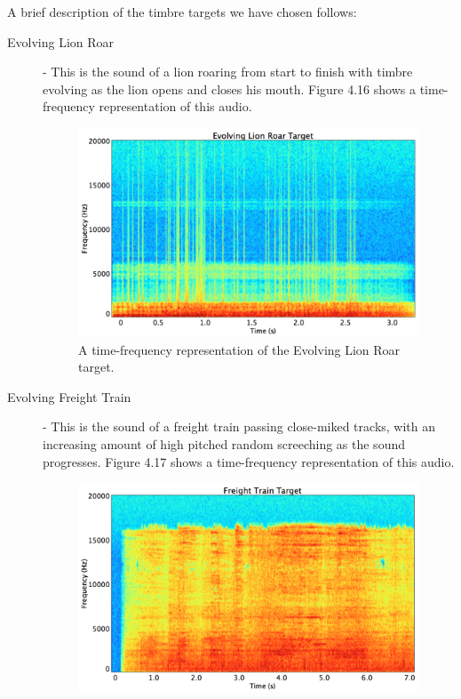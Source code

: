 \documentclass[12pt]{report} 	%
\numberwithin{figure}{chapter}
\numberwithin{table}{chapter}
\numberwithin{equation}{chapter}
\begin{document}
\begin{flushleft}
A brief description of the timbre targets we have chosen follows:
\begin{description}
\item[Evolving Lion Roar] - This is the sound of a lion roaring from start to finish with timbre evolving as the lion opens and closes his mouth. Figure 4.16 shows a time-frequency representation of this audio.
\begin{figure}[h!]
\begin{center}
\includegraphics[scale=0.35,width=\linewidth]{EvolvingLionRoarTargetSTFT}
\caption[Evolving lion roar time-frequency representation]{A time-frequency representation of the Evolving Lion Roar target.}
\end{center}
\end{figure}
\item[Evolving Freight Train] - This is the sound of a freight train passing close-miked tracks, with an increasing amount of high pitched random screeching as the sound progresses. Figure 4.17 shows a time-frequency representation of this audio.
\begin{figure}[h!]
\begin{center}
\includegraphics[scale=0.35,width=\linewidth]{FreightTrainTargetSTFT}

\end{center}
\end{figure}
\end{description}
\end{flushleft}
\end{document}
